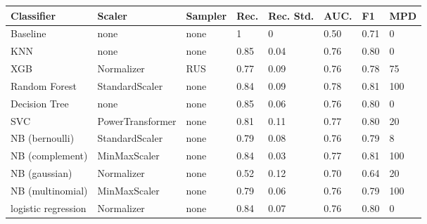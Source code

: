
\begin{table}[h]
	\begin{adjustwidth}{-0.25cm}{}

	\begin{footnotesize}
		\begin{tabular}{|l|l|l|l|l|l|l|l|}
			\hline
			\textbf{Classifier} & \textbf{Scaler}  & \textbf{Sampler} & \textbf{Rec.} & \textbf{Rec. Std.} & \textbf{AUC.} & \textbf{F1} & \textbf{MPD} \\ \hline
			Baseline            & none             & none             & 1             & 0                  & 0.50         & 0.71        & 0            \\ \hline
			KNN                 & none             & none             & 0.85          & 0.04               & 0.76         & 0.80        & 0            \\ \hline
			XGB                 & Normalizer       & RUS              & 0.77          & 0.09               & 0.76         & 0.78        & 75           \\ \hline
			Random Forest       & StandardScaler   & none             & 0.84          & 0.09               & 0.78         & 0.81        & 100          \\ \hline
			Decision Tree       & none             & none             & 0.85          & 0.06               & 0.76         & 0.80        & 0            \\ \hline
			SVC                 & PowerTransformer & none             & 0.81          & 0.11               & 0.77         & 0.80        & 20           \\ \hline
			NB (bernoulli)      & StandardScaler   & none             & 0.79          & 0.08               & 0.76         & 0.79        & 8            \\ \hline
			NB (complement)     & MinMaxScaler     & none             & 0.84          & 0.03               & 0.77         & 0.81        & 100          \\ \hline
			NB (gaussian)       & Normalizer       & none             & 0.52          & 0.12               & 0.70         & 0.64        & 20           \\ \hline
			NB (multinomial)    & MinMaxScaler     & none             & 0.79          & 0.06               & 0.76         & 0.79        & 100          \\ \hline
			logistic regression & Normalizer       & none             & 0.84          & 0.07               & 0.76         & 0.80        & 0            \\ \hline
		\end{tabular}


\end{footnotesize}
\end{adjustwidth}
\end{table}

